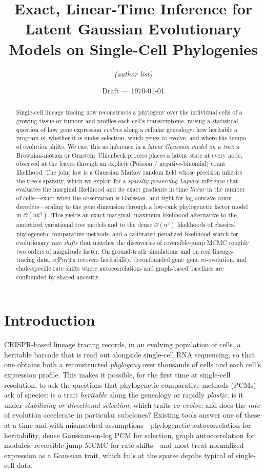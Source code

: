 \documentclass[11pt]{article}
\title{\bf Exact, Linear-Time Inference for Latent Gaussian Evolutionary
Models on Single-Cell Phylogenies}
\author{\textit{(author list)}}
\date{Draft --- \today}
\newcommand{\scphytr}{\textsc{scPhyTr}}
\newcommand{\bigO}{\mathcal{O}}
\begin{document}
\maketitle

\begin{abstract}
Single-cell lineage tracing now reconstructs a phylogeny over the individual cells of a
growing tissue or tumour and profiles each cell's transcriptome, raising a statistical
question of how gene expression \emph{evolves} along a cellular genealogy: how heritable a
program is, whether it is under selection, which genes co-evolve, and where the tempo of
evolution shifts. We cast this as inference in a \emph{latent Gaussian model on a tree}: a
Brownian-motion or Ornstein--Uhlenbeck process places a latent state at every node, observed
at the leaves through an explicit (Poisson / negative-binomial) count likelihood. The joint
law is a Gaussian Markov random field whose precision inherits the tree's sparsity, which we
exploit for a \emph{sparsity-preserving Laplace} inference that evaluates the marginal
likelihood and its exact gradients in time \emph{linear} in the number of cells---exact when
the observation is Gaussian, and tight for log-concave count decoders---scaling to the gene
dimension through a low-rank phylogenetic factor model in $\bigO(nk^3)$. This yields an
exact-marginal, maximum-likelihood alternative to the amortized variational tree models and
to the dense $\bigO(n^3)$ likelihoods of classical phylogenetic comparative methods, and a
calibrated penalized-likelihood search for evolutionary \emph{rate shifts} that matches the
discoveries of reversible-jump MCMC roughly two orders of magnitude faster. On ground-truth
simulations and on real lineage-tracing data, \scphytr{} recovers heritability, deconfounded
gene--gene co-evolution, and clade-specific rate shifts where autocorrelation- and
graph-based baselines are confounded by shared ancestry.
\end{abstract}

\section{Introduction}
\label{sec:intro}

CRISPR-based lineage tracing records, in an evolving population of cells, a heritable barcode
that is read out alongside single-cell RNA sequencing, so that one obtains both a
reconstructed \emph{phylogeny} over thousands of cells and each cell's expression profile.
This makes it possible, for the first time at single-cell resolution, to ask the questions
that phylogenetic comparative methods (PCMs) ask of species: is a trait \emph{heritable}
along the genealogy or rapidly \emph{plastic}; is it under \emph{stabilizing or directional
selection}; which traits \emph{co-evolve}; and does the \emph{rate} of evolution accelerate
in particular subclones? Existing tools answer one of these at a time and with mismatched
assumptions---phylogenetic autocorrelation for heritability, dense Gaussian-on-log PCM for
selection, graph autocorrelation for modules, reversible-jump MCMC for rate shifts---and most
treat normalized expression as a Gaussian trait, which fails at the sparse depths typical of
single-cell data.
\end{document}
